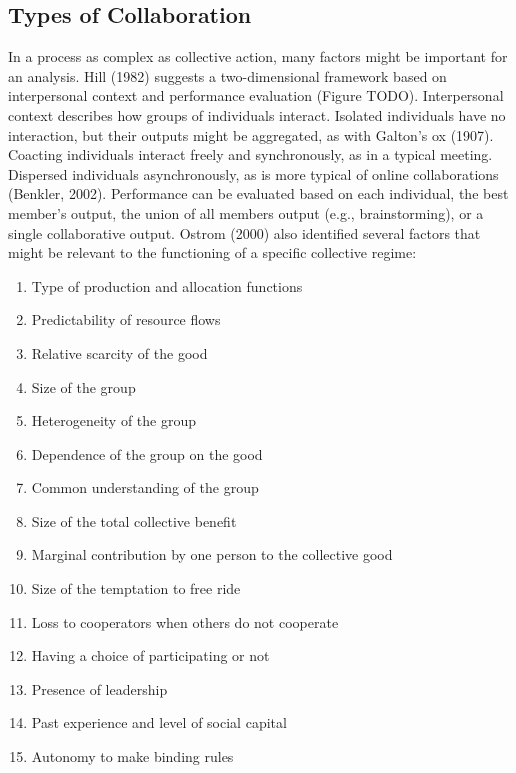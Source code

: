 \subsection{Types of Collaboration}

In a process as complex as collective action, many factors might be important for an analysis. Hill (1982) suggests a two-dimensional framework based on interpersonal context and performance evaluation (Figure TODO). Interpersonal context describes how groups of individuals interact. Isolated individuals have no interaction, but their outputs might be aggregated, as with Galton's ox (1907). Coacting individuals interact freely and synchronously, as in a typical meeting. Dispersed individuals asynchronously, as is more typical of online collaborations (Benkler, 2002). Performance can be evaluated based on each individual, the best member's output, the union of all members output (e.g., brainstorming), or a single collaborative output. Ostrom (2000) also identified several factors that might be relevant to the functioning of a specific collective regime:

\begin{enumerate}
\item{Type of production and allocation functions}
\item{Predictability of resource flows}
\item{Relative scarcity of the good}
\item{Size of the group}
\item{Heterogeneity of the group}
\item{Dependence of the group on the good}
\item{Common understanding of the group}
\item{Size of the total collective benefit}
\item{Marginal contribution by one person to the collective good}
\item{Size of the temptation to free ride}
\item{Loss to cooperators when others do not cooperate}
\item{Having a choice of participating or not}
\item{Presence of leadership}
\item{Past experience and level of social capital}
\item{Autonomy to make binding rules}
\end{enumerate}
 
